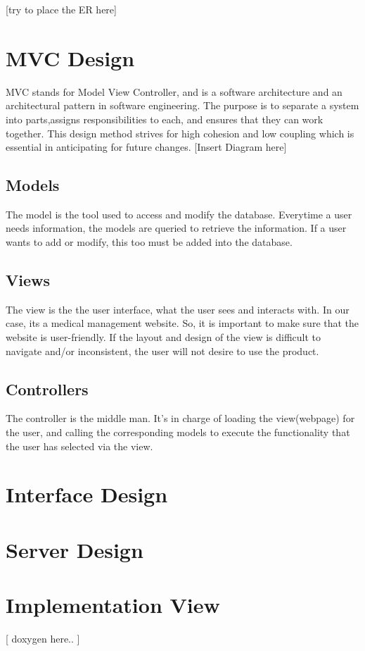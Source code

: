 \documentclass[12pt]{report}
\begin{document}
[try to place the ER here]


\chapter{MVC Design}

MVC stands for Model View Controller, and is a software architecture and an architectural pattern in software engineering. The purpose is to separate a system into parts,assigns responsibilities to each, and ensures that they can work together. This design method strives for high cohesion and low coupling which is essential in anticipating for future changes.
[Insert Diagram here]

\section{Models}
The model is the tool used to access and modify the database. Everytime a user needs information, the models are queried to retrieve the information. If a user wants to add or modify, this too must be added into the database. 

\section{Views}
The view is the the user interface, what the user sees and interacts with. In our case, its a medical management website. So, it is important to make sure that the website is user-friendly. If the layout and design of the view is difficult to navigate and/or inconsistent, the user will not desire to use the product. 

\section{Controllers}
The controller is the middle man. It's in charge of loading the view(webpage) for the user, and calling the corresponding models to execute the functionality that the user has selected via the view. 

\chapter{Interface Design}

\chapter{Server Design}

\chapter{Implementation View}
[ doxygen here.. ]
\end{document}

